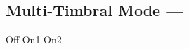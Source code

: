 \subsection[Multi-Timbral Mode]{Multi-Timbral Mode --- \UiKey{\SET}}









































Off
On1
On2
